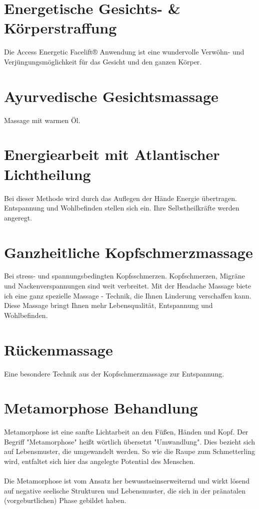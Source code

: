 \documentclass[10pt,foldmark,notumble]{leaflet}
\begin{document}


\vfill
\section{Energetische Gesichts- \& Körperstraffung}
Die Access Energetic Facelift® Anwendung ist eine wundervolle Verwöhn- und Verjüngungsmöglichkeit für das Gesicht und den ganzen Körper.
\section{Ayurvedische Gesichtsmassage}
Massage mit warmen Öl.
\section{Energiearbeit mit Atlantischer Lichtheilung}
Bei dieser Methode wird durch das Auflegen der Hände Energie übertragen. Entspannung und Wohlbefinden stellen sich ein. Ihre Selbstheilkräfte werden angeregt. 
\section{Ganzheitliche Kopfschmerzmassage}
Bei stress- und spannungsbedingten Kopfsschmerzen. 
Kopfschmerzen, Migräne und Nackenverspannungen sind weit verbreitet. Mit der Headache Massage biete ich eine ganz spezielle Massage - Technik, die Ihnen Linderung verschaffen kann. Diese Massage bringt Ihnen mehr Lebensqualität, Entspannung und Wohlbefinden. 
\vfill


\newpage

\vfill
\section{Rückenmassage}
Eine besondere Technik aus der Kopfschmerzmassage zur Entspannung. 
\vfill
\section{Metamorphose Behandlung}
Metamorphose ist eine sanfte Lichtarbeit an den Füßen, Händen und Kopf. Der Begriff "Metamorphose" heißt wörtlich übersetzt "Umwandlung". Dies bezieht sich auf Lebensmuster, die umgewandelt werden. So wie die Raupe zum Schmetterling wird, entfaltet sich hier das angelegte Potential des Menschen.\\
\\
Die Metamorphose ist vom Ansatz her bewusstseins\-erweiternd und wirkt lösend auf negative seelische Strukturen und Lebensmuster, die sich in der pränatalen (vorgeburtlichen) Phase gebildet haben.
\vfill
\end{document}
